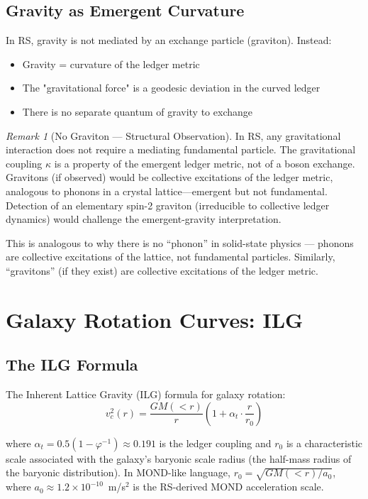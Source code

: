 \documentclass[12pt,a4paper]{article}
\theoremstyle{definition}
\theoremstyle{remark}
\newtheorem{remark}[theorem]{Remark}
\begin{document}
\subsection{Gravity as Emergent Curvature}

In RS, gravity is not mediated by an exchange particle (graviton). Instead:
\begin{itemize}
\item Gravity = curvature of the ledger metric
\item The "gravitational force" is a geodesic deviation in the curved ledger
\item There is no separate quantum of gravity to exchange
\end{itemize}

\begin{remark}[No Graviton --- Structural Observation]
In RS, any gravitational interaction does not require a mediating fundamental
particle.  The gravitational coupling $\kappa$ is a property of the emergent
ledger metric, not of a boson exchange.  Gravitons (if observed) would be
collective excitations of the ledger metric, analogous to phonons in a crystal
lattice---emergent but not fundamental.  Detection of an elementary spin-2 graviton
(irreducible to collective ledger dynamics) would challenge the emergent-gravity
interpretation.
\end{remark}

This is analogous to why there is no ``phonon'' in solid-state physics --- phonons are
collective excitations of the lattice, not fundamental particles. Similarly,
``gravitons'' (if they exist) are collective excitations of the ledger metric.

\section{Galaxy Rotation Curves: ILG}
\label{sec:ilg}

\subsection{The ILG Formula}

The Inherent Lattice Gravity (ILG) formula for galaxy rotation:
\begin{equation}
v_c^2(r) = \frac{GM(<r)}{r}\left(1 + \alpha_t \cdot \frac{r}{r_0}\right)
\end{equation}

where $\alpha_t = 0.5(1 - \varphi^{-1}) \approx 0.191$ is the ledger coupling and
$r_0$ is a characteristic scale associated with the galaxy's baryonic scale radius
(the half-mass radius of the baryonic distribution).  In MOND-like language,
$r_0 = \sqrt{GM(<r)/a_0}$, where $a_0 \approx 1.2\times10^{-10}$~m/s$^2$ is the
RS-derived MOND acceleration scale.
\end{document}
